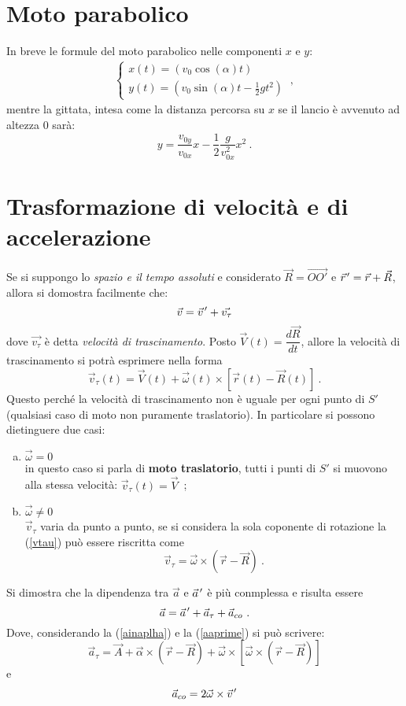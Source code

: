 \documentclass[12pt, oneside]{book}
\newcommand{\pvec}[1]{\vec{#1}\mkern2mu\vphantom{#1}}
\begin{document}
\section{Moto parabolico}
In breve le formule del moto parabolico nelle componenti $x$ e $y$:
\begin{align*}
	\begin{cases}
		x(t)=(v_0 \cos(\alpha)t)\\
		y(t)=(v_0 \sin(\alpha)t-\frac{1}{2}gt^2)
	\end{cases}~,
\end{align*}
mentre la gittata, intesa come la distanza percorsa su $x$ se il lancio è avvenuto ad altezza 0 sarà:
\[y=\dfrac{v_{0y}}{v_{0x}}x-\dfrac{1}{2}\dfrac{g}{v_{0x}^2}x^2~.\]

\section{Trasformazione di velocità e di accelerazione}
Se si suppongo lo \emph{spazio e il tempo assoluti} e considerato $\vec{R}=\overrightarrow{OO'}$ e $\pvec{r}'=\vec{r}+\vec{R}$, allora si domostra facilmente che:
\[\vec{v}=\pvec{v}'+\vec{v_\tau}\]
dove $\vec{v_\tau}$ è detta \emph{velocità di trascinamento}.
Posto $\vec{V}(t)=\dfrac{d\vec{R}}{dt}$, allore la velocità di trascinamento si potrà esprimere nella forma
\begin{equation}
\label{vtau}
\vec{v}_\tau(t)=\vec{V}(t)+\vec{\omega}(t)\times[\vec{r}(t)-\vec{R}(t)]~.
\end{equation}
Questo perché la velocità di trascinamento non è uguale per ogni punto di $S'$ (qualsiasi caso di moto non puramente traslatorio). In particolare si possono dietinguere due casi:
\begin{enumerate}[a)]
	\item $\vec{\omega}=0$\\
	in questo caso si parla di \textbf{moto traslatorio}, tutti i punti di $S'$ si muovono alla stessa velocità: $\vec{v}_\tau(t)=\vec{V}$~;
	\item $\vec{\omega}\neq 0$\\
	$\vec{v}_\tau$ varia da punto a punto, se si considera la sola coponente di rotazione la (\ref{vtau}) può essere riscritta come
	\[\vec{v}_\tau=\vec{\omega}\times(\vec{r}-\vec{R})~.\]
\end{enumerate}
Si dimostra che la dipendenza tra $\vec{a}$ e $\pvec{a}'$ è più conmplessa e risulta essere
\begin{equation}
\label{aaprime}
\vec{a}=\pvec{a}' + \vec{a}_\tau + \vec{a}_{co}~.
\end{equation}
\newpage
Dove, considerando la (\ref{ainaplha}) e la (\ref{aaprime}) si può scrivere:
\[\vec a_\tau=\vec A+\vec \alpha \times(\vec{r}-\vec{R})+\vec{\omega}\times[\vec{\omega}\times (\vec{r}-\vec{R})]\]
e
\[\vec{a}_{co}=2\vec{\omega}\times\pvec v'\]
\end{document}
